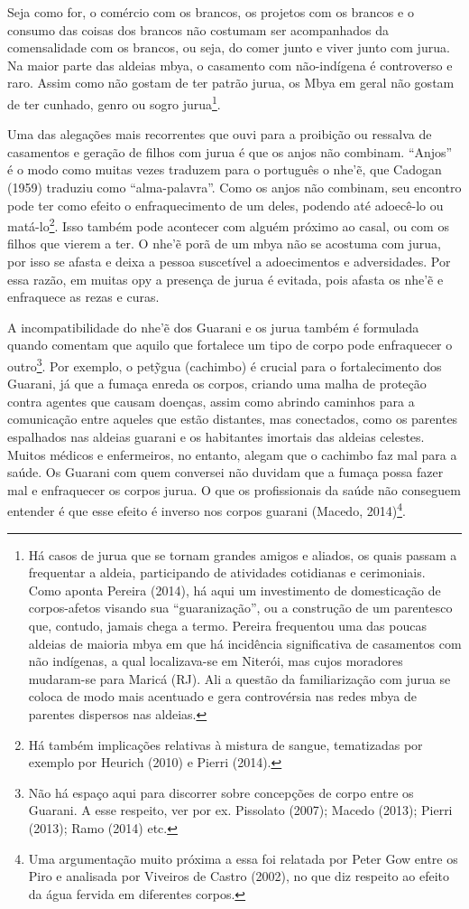 Seja como for, o comércio com os brancos, os projetos com os brancos e o
consumo das coisas dos brancos não costumam ser acompanhados da
comensalidade com os brancos, ou seja, do comer junto e viver junto com
jurua. Na maior parte das aldeias mbya, o casamento com não-indígena é
controverso e raro. Assim como não gostam de ter patrão jurua, os Mbya
em geral não gostam de ter cunhado, genro ou sogro jurua\footnote{Há
casos de jurua que se tornam grandes amigos e aliados, os quais passam
a frequentar a aldeia, participando de atividades cotidianas e
cerimoniais. Como aponta Pereira (2014), há aqui um investimento de
domesticação de corpos-afetos visando sua ``guaranização'', ou a
construção de um parentesco que, contudo, jamais chega a termo. Pereira
frequentou uma das poucas aldeias de maioria mbya em que há incidência
significativa de casamentos com não indígenas, a qual localizava-se em
Niterói, mas cujos moradores mudaram-se para Maricá (RJ). Ali a questão
da familiarização com jurua se coloca de modo mais acentuado e gera
controvérsia nas redes mbya de parentes dispersos nas aldeias.}. 

Uma das alegações mais recorrentes que ouvi para a proibição ou ressalva
de casamentos e geração de filhos com jurua é que os anjos não
combinam. ``Anjos'' é o modo como muitas vezes traduzem para o português
o nhe’\~{e}, que Cadogan (1959) traduziu como ``alma-palavra''. Como os
anjos não combinam, seu encontro pode ter como efeito o enfraquecimento
de um deles, podendo até adoecê-lo ou matá-lo\footnote{Há também
implicações relativas à mistura de sangue, tematizadas por exemplo por
Heurich (2010) e Pierri (2014).}. Isso também pode acontecer com alguém
próximo ao casal, ou com os filhos que vierem a ter. O nhe’\~{e} porã
de um mbya não se acostuma com jurua, por isso se afasta e deixa a
pessoa suscetível a adoecimentos e adversidades. Por essa razão, em
muitas opy a presença de jurua é evitada, pois afasta os nhe’\~{e} e
enfraquece as rezas e curas.

A incompatibilidade do nhe’\~{e} dos Guarani e os jurua também é
formulada quando comentam que aquilo que fortalece um tipo de corpo
pode enfraquecer o outro\footnote{Não há espaço aqui para discorrer
sobre concepções de corpo entre os Guarani. A esse respeito, ver por
ex. Pissolato (2007); Macedo (2013); Pierri (2013); Ramo (2014) etc.}.
Por exemplo, o pet\~{y}gua (cachimbo) é crucial para o fortalecimento
dos Guarani, já que a fumaça enreda os corpos, criando uma malha de
proteção contra agentes que causam doenças, assim como abrindo caminhos
para a comunicação entre aqueles que estão distantes, mas conectados,
como os parentes espalhados nas aldeias guarani e os habitantes
imortais das aldeias celestes. Muitos médicos e enfermeiros, no
entanto, alegam que o cachimbo faz mal para a saúde. Os Guarani com
quem conversei não duvidam que a fumaça possa fazer mal e enfraquecer
os corpos jurua. O que os profissionais da saúde não conseguem entender
é que esse efeito é inverso nos corpos guarani (Macedo,
2014)\footnote{Uma argumentação muito próxima a essa foi relatada por
Peter Gow entre os Piro e analisada por Viveiros de Castro (2002), no
que diz respeito ao efeito da água fervida em diferentes corpos.}. 


